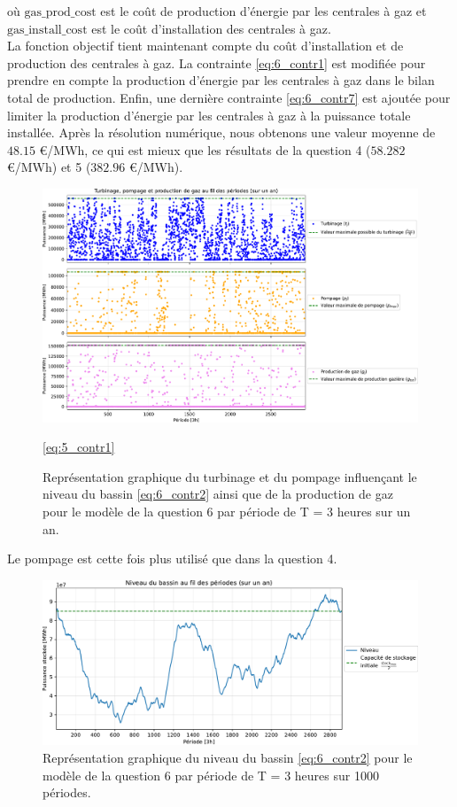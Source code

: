 \documentclass{article}
\begin{document}
\noindent où $\mathrm{gas\_prod\_cost}$ est le coût de production d'énergie par les centrales à gaz et $\mathrm{gas\_install\_cost}$ est le coût d'installation des centrales à gaz.\\
La fonction objectif tient maintenant compte du coût d'installation et de production des centrales à gaz. La contrainte \eqref{eq:6_contr1} est modifiée pour prendre en compte la production d'énergie par les centrales à gaz dans le bilan total de production. 
Enfin, une dernière contrainte \eqref{eq:6_contr7} est ajoutée pour limiter la production d'énergie par les centrales à gaz à la puissance totale installée.
Après la résolution numérique, nous obtenons une valeur moyenne de $\mathbf{48.15}$ \euro/MWh, ce qui est mieux que 
les résultats de la question 4 ($\mathbf{58.282}$ \euro/MWh) et 5 ($\mathbf{382.96}$ \euro/MWh).
\begin{figure}[H]
    \centering
    \includegraphics[scale=0.6]{GraphesP2/Productions_Q6.pdf}
    \caption{Représentation graphique du turbinage et du pompage
    influençant le niveau du bassin \eqref{eq:6_contr2} ainsi que de la production de gaz pour le modèle de la question 6 par période de T = 3 heures sur un an.} 
    \eqref{eq:5_contr1}
    \label{fig:Q61}
\end{figure}
Le pompage est cette fois plus utilisé que dans la question 4.
\begin{figure}[h!]
    \centering
    \includegraphics[scale=0.5]{GraphesP2/Niveau_Bassin_Q6.pdf}
    \caption{Représentation graphique du niveau du bassin \eqref{eq:6_contr2} pour le modèle 
    de la question 6 par période de T = 3 heures sur 1000 périodes.} 
    \label{fig:Q62}
\end{figure}
\end{document}

